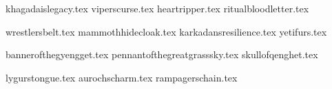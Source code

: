 
\raggedcolumns
\begin{multicols*}{2}

	\subtitle{\weaponenchantments}	
	\startsortedpricelist
	
	{khagadaislegacy.tex}
	{viperscurse.tex}
	{heartripper.tex}
	{ritualbloodletter.tex}
	
	\endsortedpricelist

	\subtitle{\armourenchantments}
	\startsortedpricelistNSP
	
	{wrestlersbelt.tex}
	{mammothhidecloak.tex}
	{karkadansresilience.tex}
	{yetifurs.tex}

	\endsortedpricelistNSP
	
	\subtitle{\bannerenchantments}
	\startsortedpricelist
	
	{bannerofthegyengget.tex}
	{pennantofthegreatgrasssky.tex}
	{skullofqenghet.tex}

	\endsortedpricelist

	\subtitle{\artefacts}
	\startsortedpricelist

	{lygurstongue.tex}
	{aurochscharm.tex}
	{rampagerschain.tex}

	\endsortedpricelist

\end{multicols*}
